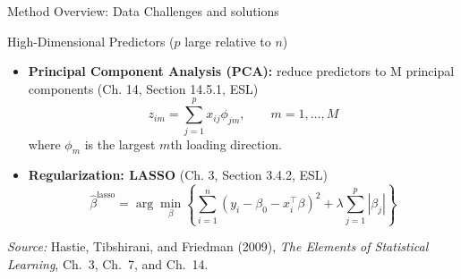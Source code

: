 \documentclass[aspectratio=169,t]{beamer} %
\begin{document}
\begin{frame}[t,shrink=8]{Method Overview: Data Challenges and solutions}

\begin{block}{High-Dimensional Predictors ($p$ large relative to $n$)}
\begin{itemize}
    \item \textbf{Principal Component Analysis (PCA):} reduce predictors to M principal components (Ch. 14, Section 14.5.1, ESL)
    \[
    z_{im} = \sum_{j=1}^p x_{ij} \phi_{jm}, \qquad m=1,\dots,M
    \]
    where $\phi_m$ is the largest $m$th loading direction.
    
    \item \textbf{Regularization: LASSO} (Ch. 3, Section 3.4.2, ESL)
    \[
    \hat{\beta}^{\mathrm{lasso}}
    = \arg\min_{\beta}\left\{
    \sum_{i=1}^n (y_i-\beta_0-x_i^\top \beta)^2
    + \lambda \sum_{j=1}^p |\beta_j|
    \right\}
    \]
\end{itemize}
\end{block}
\vfill
{\tiny \textit{Source:} Hastie, Tibshirani, and Friedman (2009), \textit{The Elements of Statistical Learning}, Ch.~3, Ch.~7, and Ch.~14.}

\end{frame}
\end{document}
